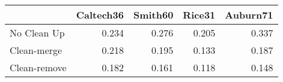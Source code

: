 \begin{tabular}{lrrrr}
\toprule
{} & Caltech36 & Smith60 & Rice31 & Auburn71 \\
\midrule
No Clean Up  &     0.234 &   0.276 &  0.205 &    0.337 \\
Clean-merge  &     0.218 &   0.195 &  0.133 &    0.187 \\
Clean-remove &     0.182 &   0.161 &  0.118 &    0.148 \\
\bottomrule
\end{tabular}

